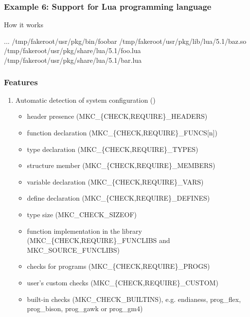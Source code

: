 \documentclass[hyperref={colorlinks=true}]{beamer}
\begin{document}
\begin{frame}[fragile]
  \frametitle{Example 6: Support for Lua programming language}

  \begin{block}{How it works}
  \begin{CodeNoLabel}
    ...
/tmp/fakeroot/usr/pkg/bin/foobar
/tmp/fakeroot/usr/pkg/lib/lua/5.1/baz.so
/tmp/fakeroot/usr/pkg/share/lua/5.1/foo.lua
/tmp/fakeroot/usr/pkg/share/lua/5.1/bar.lua
\prompt{\$}
  \end{CodeNoLabel}
  \end{block}
\end{frame}

\begin{frame}[fragile]
  \frametitle{Features}
  \begin{block}{}
  \begin{enumerate}
  \item Automatic detection of system configuration
    ()
    \begin{itemize}
    \item header presence (MKC\_\{CHECK,REQUIRE\}\_HEADERS)
    \item function declaration (MKC\_\{CHECK,REQUIRE\}\_FUNCS[n])
    \item type declaration (MKC\_\{CHECK,REQUIRE\}\_TYPES)
    \item structure member (MKC\_\{CHECK,REQUIRE\}\_MEMBERS)
    \item variable declaration (MKC\_\{CHECK,REQUIRE\}\_VARS)
    \item define declaration (MKC\_\{CHECK,REQUIRE\}\_DEFINES)
    \item type size (MKC\_CHECK\_SIZEOF)
    \item function implementation in the library
      (MKC\_\{CHECK,REQUIRE\}\_FUNCLIBS and MKC\_SOURCE\_FUNCLIBS)
    \item checks for programs (MKC\_\{CHECK,REQUIRE\}\_PROGS)
    \item user's custom checks (MKC\_\{CHECK,REQUIRE\}\_CUSTOM)
    \item built-in checks (MKC\_CHECK\_BUILTINS), e.g. endianess,
      prog\_flex, prog\_bison, prog\_gawk or prog\_gm4)
    \end{itemize}
  \end{enumerate}
  \end{block}
\end{frame}
\end{document}
